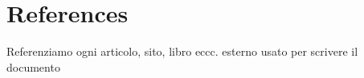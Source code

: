 \documentclass[../../dd.tex]{subfiles}
\begin{document}
	\chapter{References}
		Referenziamo ogni articolo, sito, libro eccc. esterno usato per scrivere il documento
\end{document}
